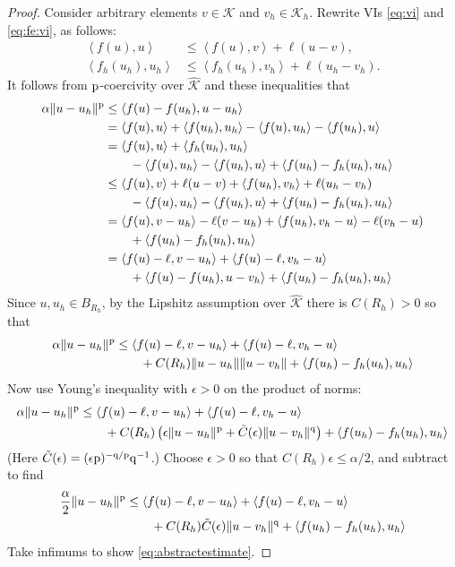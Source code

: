 \documentclass[hidelinks,onefignum,onetabnum,final]{siamart220329}  %
\newcommand{\eps}{\epsilon}
\newcommand{\cK}{\mathcal{K}}
\newcommand{\hcK}{\widehat{\cK}}
\newcommand{\pp}{{\text{\textnormal{p}}}}
\newcommand{\qq}{{\text{\textnormal{q}}}}
\newcommand{\ip}[2]{\left<#1,#2\right>}
\begin{document}
\begin{proof}  Consider arbitrary elements $v\in\cK$ and $v_h\in\cK_h$.  Rewrite VIs \eqref{eq:vi} and \eqref{eq:fe:vi}, as follows:
\begin{align*}
\ip{f(u)}{u}     &\le \ip{f(u)}{v} + \ell(u-v),  \\
\ip{f_h(u_h)}{u_h} &\le \ip{f_h(u_h)}{v_h} + \ell(u_h-v_h).
\end{align*}
It follows from $\pp$-coercivity over $\hcK$ and these inequalities that
\begin{align*}
\alpha \|u-u_h\|^\pp &\le \ip{f(u)-f(u_h)}{u-u_h} \\
  &= \ip{f(u)}{u} + \ip{f(u_h)}{u_h} - \ip{f(u)}{u_h} - \ip{f(u_h)}{u} \\
  &= \ip{f(u)}{u} + \ip{f_h(u_h)}{u_h} \\
  &\qquad - \ip{f(u)}{u_h} - \ip{f(u_h)}{u} + \ip{f(u_h)-f_h(u_h)}{u_h} \\
  &\le \ip{f(u)}{v} + \ell(u-v) + \ip{f(u_h)}{v_h} + \ell(u_h-v_h) \\
  &\qquad - \ip{f(u)}{u_h} - \ip{f(u_h)}{u} + \ip{f(u_h)-f_h(u_h)}{u_h} \\
  &= \ip{f(u)}{v-u_h} - \ell(v-u_h) + \ip{f(u_h)}{v_h-u} - \ell(v_h-u) \\
  &\qquad + \ip{f(u_h)-f_h(u_h)}{u_h} \\
  &= \ip{f(u)-\ell}{v-u_h} + \ip{f(u)-\ell}{v_h-u} \\
  &\qquad + \ip{f(u)-f(u_h)}{u-v_h} + \ip{f(u_h)-f_h(u_h)}{u_h}
\end{align*}
Since $u,u_h\in B_{R_h}$, by the Lipshitz assumption over $\hcK$ there is $C(R_h)>0$ so that
\begin{align*}
\alpha \|u-u_h\|^\pp &\le \ip{f(u)-\ell}{v-u_h} + \ip{f(u)-\ell}{v_h-u} \\
  &\qquad + C(R_h) \|u-u_h\|\|u-v_h\| + \ip{f(u_h)-f_h(u_h)}{u_h}
\end{align*}
Now use Young's inequality with $\eps>0$ \cite[Appendix B.2]{Evans2010} on the product of norms:
\begin{align*}
\alpha \|u-u_h\|^\pp &\le \ip{f(u)-\ell}{v-u_h} + \ip{f(u)-\ell}{v_h-u} \\
  &\qquad + C(R_h) \left(\eps\|u-u_h\|^\pp + \tilde C(\eps) \|u-v_h\|^\qq\right) + \ip{f(u_h)-f_h(u_h)}{u_h}
\end{align*}
(Here $\tilde C(\eps) = (\eps \pp)^{-\qq/\pp} \qq^{-1}$.)  Choose $\eps>0$ so that $C(R_h) \eps \le \alpha/2$, and subtract to find
\begin{align*}
\frac{\alpha}{2} \|u-u_h\|^\pp &\le \ip{f(u)-\ell}{v-u_h} + \ip{f(u)-\ell}{v_h-u} \\
  &\qquad + C(R_h) \tilde C(\eps) \|u-v_h\|^\qq + \ip{f(u_h)-f_h(u_h)}{u_h}
\end{align*}
Take infimums to show \eqref{eq:abstractestimate}.
\end{proof}
\end{document}
